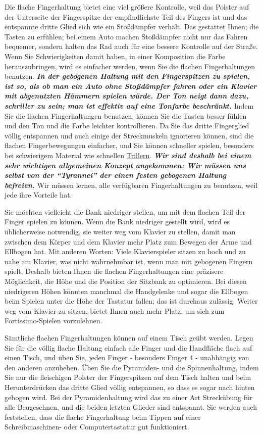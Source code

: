 Die flache Fingerhaltung bietet eine viel größere Kontrolle, weil das Polster auf der Unterseite der Fingerspitze der empfindlichste Teil des Fingers ist und das entspannte dritte Glied sich wie ein Stoßdämpfer verhält.
Das gestattet Ihnen; die Tasten zu erfühlen; bei einem Auto machen Stoßdämpfer nicht nur das Fahren bequemer, sondern halten das Rad auch für eine bessere Kontrolle auf der Straße.
Wenn Sie Schwierigkeiten damit haben, in einer Komposition die Farbe herauszubringen, wird es einfacher werden, wenn Sie die flachen Fingerhaltungen benutzen.
\textbf{\textit{In der gebogenen Haltung mit den Fingerspitzen zu spielen, ist so, als ob man ein Auto ohne Stoßdämpfer fahren oder ein Klavier mit abgenutzten Hämmern spielen würde.
Der Ton neigt dann dazu, schriller zu sein; man ist effektiv auf eine Tonfarbe beschränkt.}}
Indem Sie die flachen Fingerhaltungen benutzen, können Sie die Tasten besser fühlen und den Ton und die Farbe leichter kontrollieren.
Da Sie das dritte Fingerglied völlig entspannen und auch einige der Streckmuskeln ignorieren können, sind die flachen Fingerbewegungen einfacher, und Sie können schneller spielen, besonders bei schwierigem Material wie schnellen \hyperref[c1iii3]{Trillern}.
\textbf{\textit{Wir sind deshalb bei einem sehr wichtigen allgemeinen Konzept angekommen: Wir müssen uns selbst von der \enquote{Tyrannei} der einen festen gebogenen Haltung befreien.}}
Wir müssen lernen, alle verfügbaren Fingerhaltungen zu benutzen, weil jede ihre Vorteile hat.

Sie möchten vielleicht die Bank niedriger stellen, um mit dem flachen Teil der Finger spielen zu können.
Wenn die Bank niedriger gestellt wird, wird es üblicherweise notwendig, sie weiter weg vom Klavier zu stellen, damit man zwischen dem Körper und dem Klavier mehr Platz zum Bewegen der Arme und Ellbogen hat.
Mit anderen Worten: Viele Klavierspieler sitzen zu hoch und zu nahe am Klavier, was nicht wahrnehmbar ist, wenn man mit gebogenen Fingern spielt.
Deshalb bieten Ihnen die flachen Fingerhaltungen eine präzisere Möglichkeit, die Höhe und die Position der Sitzbank zu optimieren.
Bei diesen niedrigeren Höhen könnten manchmal die Handgelenke und sogar die Ellbogen beim Spielen unter die Höhe der Tastatur fallen; das ist durchaus zulässig.
Weiter weg vom Klavier zu sitzen, bietet Ihnen auch mehr Platz, um sich zum Fortissimo-Spielen vorzulehnen.

Sämtliche flachen Fingerhaltungen können auf einem Tisch geübt werden.
Legen Sie für die völlig flache Haltung einfach alle Finger und die Handfläche flach auf einen Tisch, und üben Sie, jeden Finger - besonders Finger 4 - unabhängig von den anderen anzuheben.
Üben Sie die Pyramiden- und die Spinnenhaltung, indem Sie nur die fleischigen Polster der Fingerspitzen auf dem Tisch halten und beim Herunterdrücken das dritte Glied völlig entspannen, so dass es sogar nach hinten gebogen wird.
Bei der Pyramidenhaltung wird das zu einer Art Streckübung für alle Beugesehnen, und die beiden letzten Glieder sind entspannt.
Sie werden auch feststellen, dass die flache Fingerhaltung beim Tippen auf einer Schreibmaschinen- oder Computertastatur gut funktioniert.

